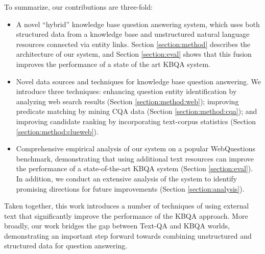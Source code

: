 To summarize, our contributions are three-fold:
\vspace{-0.1cm}
\begin{itemize}
\item A novel ``hybrid'' knowledge base question answering system, which uses both structured data from a knowledge base and unstructured natural language resources connected via entity links. Section \ref{section:method} describes the architecture of our system, and Section \ref{section:eval} shows that this fusion improves the performance of a state of the art KBQA system.
\item Novel data sources and techniques for knowledge base question answering. We introduce three techniques: enhancing question entity identification by analyzing web search results (Section \ref{section:method:web}); improving predicate matching by mining CQA data (Section \ref{section:method:cqa}); and improving candidate ranking by incorporating text-corpus statistics (Section \ref{section:method:clueweb}).
\item Comprehensive empirical analysis of our system on a popular WebQuestions benchmark, demonstrating that using additional text resources can improve the performance of a state-of-the-art KBQA system (Section \ref{section:eval}). In addition, we conduct an extensive analysis of the system to identify promising directions for future improvements (Section \ref{section:analysis}).
\end{itemize}
\vspace{-0.1cm}

Taken together, this work introduces a number of techniques of using external text that significantly improve the performance of the KBQA approach. More broadly, our work bridges the gap between Text-QA and KBQA worlds, demonstrating an important step forward towards combining unstructured and structured data for question answering. 




